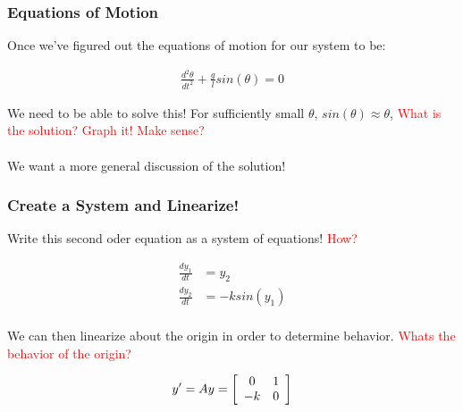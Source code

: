 \documentclass[serif]{beamer}
\begin{document}
\begin{frame}
\frametitle{Equations of Motion} 

Once we've figured out the equations of motion for our system to be: 

\begin{align*}
\frac{d^2 \theta}{dt^2} + \frac{g}{l}sin(\theta) = 0 
\end{align*}

We need to be able to solve this! For sufficiently small $\theta$, $sin(\theta) \approx \theta$, \textcolor{red}{What is the solution? Graph it! Make sense?}\\
\ \\
We want a more general discussion of the solution! 

\end{frame}

\begin{frame}
\frametitle{Create a System and Linearize!} 

Write this second oder equation as a system of equations! \textcolor{red}{How?}

\begin{align*}
\frac{dy_{1}}{dt} &= y_2\\
\frac{dy_{2}}{dt} &= -ksin(y_1)
\end{align*}
\ \\

We can then linearize about the origin in order to determine behavior. \textcolor{red}{Whats the behavior of the origin?} 

\begin{align*}
y' = Ay =\left[ \begin{array}{c c }
 0 & 1\\
-k & 0 
\end{array}\right ]
\end{align*}

\end{frame}
%
\end{document}
